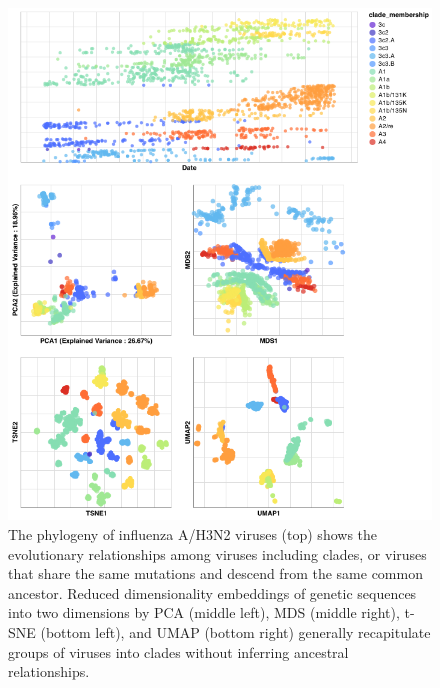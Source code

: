 \documentclass[9pt,lineno]{elife}
\begin{document}
\begin{figure}[htb]
  \begin{center}
  \includegraphics[width=\columnwidth]{flu-embeddings}
  \caption{
    The phylogeny of influenza A/H3N2 viruses (top) shows the evolutionary relationships among viruses including clades, or viruses that share the same mutations and descend from the same common ancestor.
    Reduced dimensionality embeddings of genetic sequences into two dimensions by PCA (middle left), MDS (middle right), t-SNE (bottom left), and UMAP (bottom right) generally recapitulate groups of viruses into clades without inferring ancestral relationships.
  }
  \label{fig:seasonal-influenza-h3n2-ha-embeddings}
  \end{center}
\end{figure}
\end{document}
